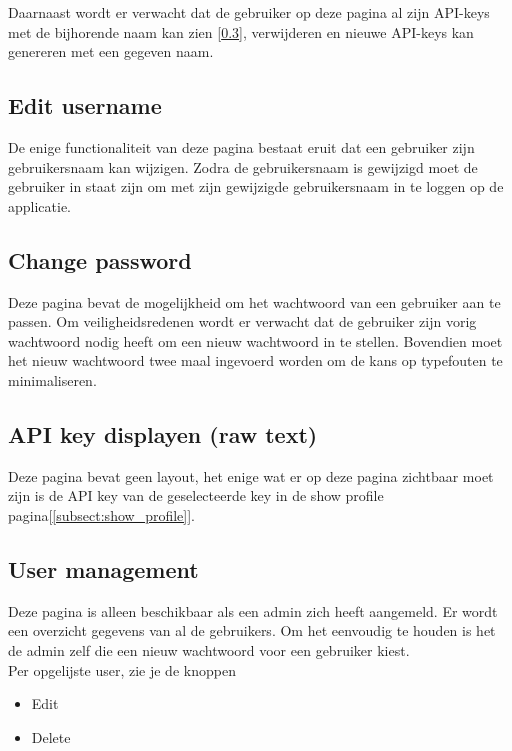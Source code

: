 \documentclass{article}
\begin{document}
Daarnaast wordt er verwacht dat de gebruiker op deze pagina al zijn API-keys met de bijhorende naam kan zien [\ref{subsect:raw_api}], verwijderen en nieuwe API-keys kan genereren met een gegeven naam.

\subsection{Edit username}
\label{subsect:Edit_profile}
De enige functionaliteit van deze pagina bestaat eruit dat een gebruiker zijn gebruikersnaam kan wijzigen. Zodra de gebruikersnaam is gewijzigd moet de gebruiker in staat zijn om met zijn gewijzigde gebruikersnaam in te loggen op de applicatie.

\subsection{Change password}
\label{subsect:change_password}
Deze pagina bevat de mogelijkheid om het wachtwoord van een gebruiker aan te passen. Om veiligheidsredenen wordt er verwacht dat de gebruiker zijn vorig wachtwoord nodig heeft om een nieuw wachtwoord in te stellen. Bovendien moet het nieuw wachtwoord twee maal ingevoerd worden om de kans op typefouten te minimaliseren.


\subsection{API key displayen (raw text)}
\label{subsect:raw_api}
Deze pagina bevat geen layout, het enige wat er op deze pagina zichtbaar moet zijn is de API key van de geselecteerde key in de show profile pagina[\ref{subsect:show_profile}].


\subsection{User management}
\label{subsect: user management}
Deze pagina is alleen beschikbaar als een admin zich heeft aangemeld. Er wordt een overzicht gegevens van al de gebruikers. Om het eenvoudig te houden is het de admin zelf die een nieuw wachtwoord voor een gebruiker kiest. \\

Per opgelijste user, zie je de knoppen 
\begin{itemize}
    \item Edit
    \item Delete
\end{itemize}
\end{document}
